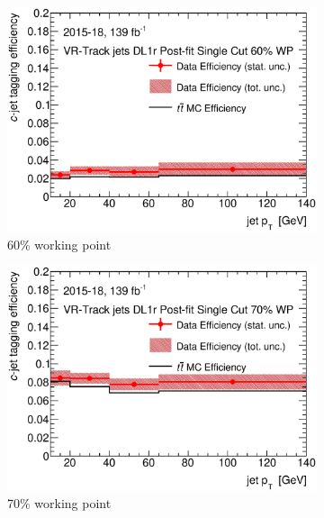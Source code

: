 \documentclass[letterpaper,12pt]{article}
\begin{document}
	\begin{figure}[H]
		\centering
		\begin{subfigure}[t]{.35\linewidth}
			\includegraphics[width=1\textwidth]{FTAG_plots/DL1rallVRJetsDec/eff60.eps}
			\caption{60\% working point}
				\end{subfigure}
			\begin{subfigure}[t]{.35\linewidth}
				\includegraphics[width=1\textwidth]{FTAG_plots/DL1rallVRJetsDec/eff70.eps}
				\caption{70\% working point}
			\end{subfigure}
			\begin{subfigure}[t]{.35\linewidth}

\end{subfigure}
\end{figure}
\end{document}
